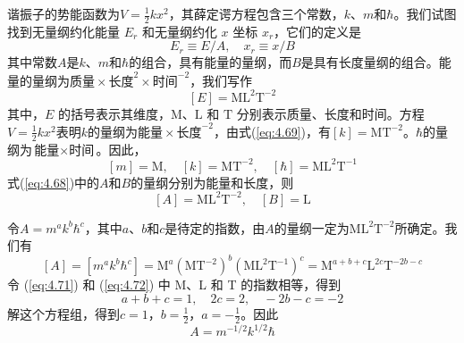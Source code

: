     谐振子的势能函数为$V = \frac{1}{2}kx^2$，其薛定谔方程包含三个常数，$k$、$m$和$\hbar$。我们试图找到无量纲约化能量 $E_r$ 和无量纲约化 $x$ 坐标 $x_r$，它们的定义是
    \begin{equation}
        E_r \equiv E/A, \quad x_r \equiv x/B
        \label{eq:4.68}
    \end{equation}
    其中常数$A$是$k$、$m$和$\hbar$的组合，具有能量的量纲，而$B$是具有长度量纲的组合。能量的量纲为$\text{质量}\times\text{长度}^2\times\text{时间}^{-2}$，我们写作
    \begin{equation}
        \left[E\right] = \mathrm{M}\mathrm{L}^2\mathrm{T}^{-2}
        \label{eq:4.69}
    \end{equation}
    其中，$E$ 的括号表示其维度，$\mathrm{M}$、$\mathrm{L}$ 和 $\mathrm{T}$ 分别表示质量、长度和时间。方程$V = \frac{1}{2}kx^2$表明$k$的量纲为$\text{能量}\times\text{长度}^{-2}$，由式(\ref{eq:4.69})，有$\left[k\right] = \mathrm{M}\mathrm{T}^{-2}$。$\hbar$的量纲为$\text{能量}\times\text{时间}$。因此，
    \begin{equation}
        \left[m\right] = \mathrm{M}, \quad \left[k\right] = \mathrm{M}\mathrm{T}^{-2}, \quad \left[\hbar\right] = \mathrm{M}\mathrm{L}^2\mathrm{T}^{-1}
        \label{eq:4.70}
    \end{equation}
    式(\ref{eq:4.68})中的$A$和$B$的量纲分别为能量和长度，则
    \begin{equation}
        \left[A\right] = \mathrm{M}\mathrm{L}^2\mathrm{T}^{-2}, \quad \left[B\right] = \mathrm{L}
        \label{eq:4.71}
    \end{equation}

    令$A = m^ak^b\hbar^c$，其中$a$、$b$和$c$是待定的指数，由$A$的量纲一定为$\mathrm{M}\mathrm{L}^2\mathrm{T}^{-2}$所确定。我们有
    \begin{equation}
        \left[A\right] = \left[m^ak^b\hbar^c\right] = \mathrm{M}^a\left(\mathrm{M}\mathrm{T}^{-2}\right)^b\left(\mathrm{M}\mathrm{L}^2\mathrm{T}^{-1}\right)^c = \mathrm{M}^{a+b+c}\mathrm{L}^{2c}\mathrm{T}^{-2b-c}
        \label{eq:4.72}
    \end{equation}
    令 (\ref{eq:4.71}) 和 (\ref{eq:4.72}) 中 M、L 和 T 的指数相等，得到
    \begin{equation*}
        a+b+c = 1, \quad 2c = 2, \quad -2b-c = -2
    \end{equation*}
    解这个方程组，得到$c=1$，$b=\frac{1}{2}$，$a=-\frac{1}{2}$。因此
    \begin{equation}
        A = m^{-1/2}k^{1/2}\hbar
        \label{eq:4.73}
    \end{equation}

